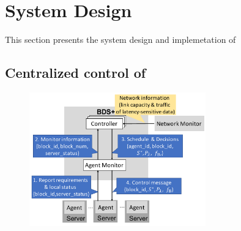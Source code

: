 \section{System Design}
\label{sec:system}

This section presents the system design and implemetation of 

\subsection{Centralized control of \name}
\label{subsec:system:centralized}

\begin{figure}[t]
  \centering
  \includegraphics[width=3in]{images/implementation_journal.pdf}
  \label{fig:implementation}
\end{figure}

